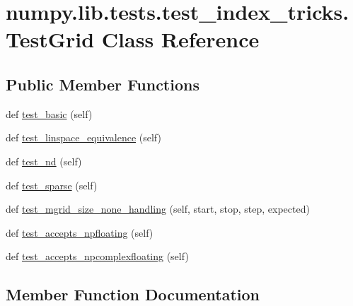 \hypertarget{classnumpy_1_1lib_1_1tests_1_1test__index__tricks_1_1TestGrid}{}\section{numpy.\+lib.\+tests.\+test\+\_\+index\+\_\+tricks.\+Test\+Grid Class Reference}
\label{classnumpy_1_1lib_1_1tests_1_1test__index__tricks_1_1TestGrid}
\subsection*{Public Member Functions}
\begin{DoxyCompactItemize}
\item 
def \hyperlink{classnumpy_1_1lib_1_1tests_1_1test__index__tricks_1_1TestGrid_a7d3b38a9c9345adf6f3da25356f3b588}{test\+\_\+basic} (self)
\item 
def \hyperlink{classnumpy_1_1lib_1_1tests_1_1test__index__tricks_1_1TestGrid_a528dcc2c6d8123286ca2cc4b6ff697ea}{test\+\_\+linspace\+\_\+equivalence} (self)
\item 
def \hyperlink{classnumpy_1_1lib_1_1tests_1_1test__index__tricks_1_1TestGrid_ade20603496bcd0b199ab32deb6eaf927}{test\+\_\+nd} (self)
\item 
def \hyperlink{classnumpy_1_1lib_1_1tests_1_1test__index__tricks_1_1TestGrid_aaae29e39f5009523273cf80aea61fb58}{test\+\_\+sparse} (self)
\item 
def \hyperlink{classnumpy_1_1lib_1_1tests_1_1test__index__tricks_1_1TestGrid_ae580f4ef671fff0a1eca29a55403cd65}{test\+\_\+mgrid\+\_\+size\+\_\+none\+\_\+handling} (self, start, stop, step, expected)
\item 
def \hyperlink{classnumpy_1_1lib_1_1tests_1_1test__index__tricks_1_1TestGrid_ad8014b532dd54692a2263e49673eaedd}{test\+\_\+accepts\+\_\+npfloating} (self)
\item 
def \hyperlink{classnumpy_1_1lib_1_1tests_1_1test__index__tricks_1_1TestGrid_a549c4e4c189de097acb29e003804283c}{test\+\_\+accepts\+\_\+npcomplexfloating} (self)
\end{DoxyCompactItemize}


\subsection{Member Function Documentation}
\mbox{\label{classnumpy_1_1lib_1_1tests_1_1test__index__tricks_1_1TestGrid_a549c4e4c189de097acb29e003804283c}} 
